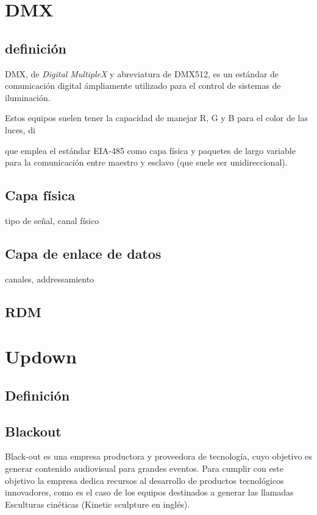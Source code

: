  

\section{DMX}
\subsection{definición}
DMX, de \textit{Digital MultipleX} y abreviatura de DMX512, es un estándar de comunicación digital ámpliamente utilizado para el control de sistemas de iluminación. 

Estos equipos suelen tener la capacidad de manejar  R, G y B para el color de las luces, di

 que emplea el estándar EIA-485 como capa física y paquetes de largo variable para la comunicación entre maestro y esclavo (que suele ser unidireccional).
\subsection{Capa física}
tipo de señal, canal físico

\subsection{Capa de enlace de datos}
canales, addressamiento

\subsection{RDM}




\section{Updown}
\subsection{Definición}

\subsection{Blackout}
Black-out es una empresa productora y proveedora de tecnología, cuyo objetivo es generar contenido audiovisual para grandes eventos. Para cumplir con este objetivo la empresa dedica recursos al desarrollo de productos tecnológicos innovadores, como es el caso de los equipos destinados a generar las llamadas Esculturas cinéticas (Kinetic sculpture en inglés).\\

